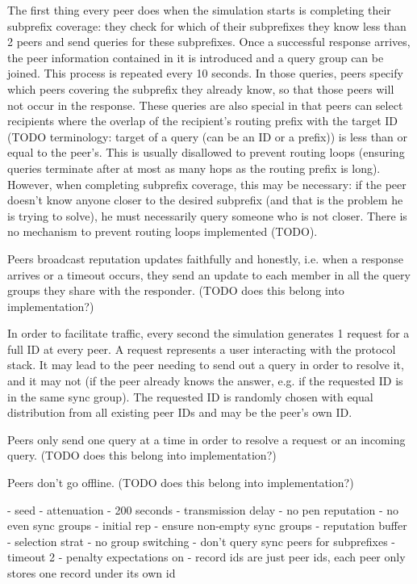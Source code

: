 The first thing every peer does when the simulation starts is completing their
subprefix coverage: they check for which of their subprefixes they know less
than 2 peers and send queries for these subprefixes. Once a successful response
arrives, the peer information contained in it is introduced and a query group
can be joined. This process is repeated every 10 seconds. In those queries,
peers specify which peers covering the subprefix they already know, so that
those peers will not occur in the response. These queries are also special in
that peers can select recipients where the overlap of the recipient's routing
prefix with the target ID (TODO terminology: target of a query (can be an ID or
a prefix)) is less than or equal to the peer's. This is usually disallowed to
prevent routing loops (ensuring queries terminate after at most as many hops as
the routing prefix is long). However, when completing subprefix coverage, this
may be necessary: if the peer doesn't know anyone closer to the desired
subprefix (and that is the problem he is trying to solve), he must necessarily
query someone who is not closer. There is no mechanism to prevent routing loops
implemented (TODO).

Peers broadcast reputation updates faithfully and honestly, i.e. when a response
arrives or a timeout occurs, they send an update to each member in all the query
groups they share with the responder. (TODO does this belong into
implementation?)

In order to facilitate traffic, every second the simulation generates 1 request
for a full ID at every peer. A request represents a user interacting with the
protocol stack. It may lead to the peer needing to send out a query in order to
resolve it, and it may not (if the peer already knows the answer, e.g. if the
requested ID is in the same sync group). The requested ID is randomly chosen
with equal distribution from all existing peer IDs and may be the peer's own ID.

Peers only send one query at a time in order to resolve a request or an incoming
query. (TODO does this belong into implementation?)

Peers don't go offline. (TODO does this belong into implementation?)

- seed
- attenuation
- 200 seconds
- transmission delay
- no pen reputation
- no even sync groups
- initial rep
- ensure non-empty sync groups
- reputation buffer
- selection strat
- no group switching
- don't query sync peers for subprefixes
- timeout 2
- penalty expectations on
- record ids are just peer ids, each peer only stores one record under its own
  id
